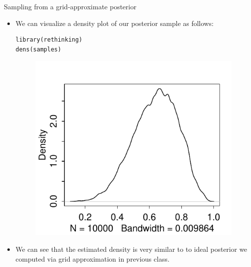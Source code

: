 \documentclass[handout]{beamer}
\begin{document}
\begin{frame}[fragile]{Sampling from a grid-approximate posterior}
\scriptsize{
\begin{itemize}

\item We can visualize a density plot of our posterior sample as follows:

\begin{verbatim}
library(rethinking)
dens(samples) 
\end{verbatim}

   \begin{figure}[h!]
	\centering
	\includegraphics[scale=0.7]{pics/posteriorTossGrid.pdf}
	\end{figure} 
 




\item We can see that the estimated density is very similar to to ideal posterior we computed via
grid approximation in previous class.


 
\end{itemize}



} 

\end{frame}
\end{document}
